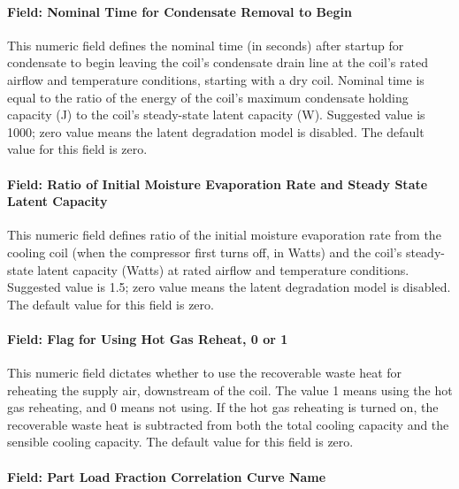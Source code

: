 \paragraph{Field: Nominal Time for Condensate Removal to Begin}\label{field-nominal-time-for-condensate-removal-to-begin-5}

This numeric field defines the nominal time (in seconds) after startup for condensate to begin leaving the coil's condensate drain line at the coil's rated airflow and temperature conditions, starting with a dry coil. Nominal time is equal to the ratio of the energy of the coil's maximum condensate holding capacity (J) to the coil's steady-state latent capacity (W). Suggested value is 1000; zero value means the latent degradation model is disabled. The default value for this field is zero.

\paragraph{Field: Ratio of Initial Moisture Evaporation Rate and Steady State Latent Capacity}\label{field-ratio-of-initial-moisture-evaporation-rate-and-steady-state-latent-capacity-5}

This numeric field defines ratio of the initial moisture evaporation rate from the cooling coil (when the compressor first turns off, in Watts) and the coil's steady-state latent capacity (Watts) at rated airflow and temperature conditions. Suggested value is 1.5; zero value means the latent degradation model is disabled. The default value for this field is zero.

\paragraph{Field: Flag for Using Hot Gas Reheat, 0 or 1}\label{field-flag-for-using-hot-gas-reheat-0-or-1}

This numeric field dictates whether to use the recoverable waste heat for reheating the supply air, downstream of the coil. The value 1 means using the hot gas reheating, and 0 means not using. If the hot gas reheating is turned on, the recoverable waste heat is subtracted from both the total cooling capacity and the sensible cooling capacity. The default value for this field is zero.

\paragraph{Field: Part Load Fraction Correlation Curve Name}\label{field-part-load-fraction-correlation-curve-name-10}

